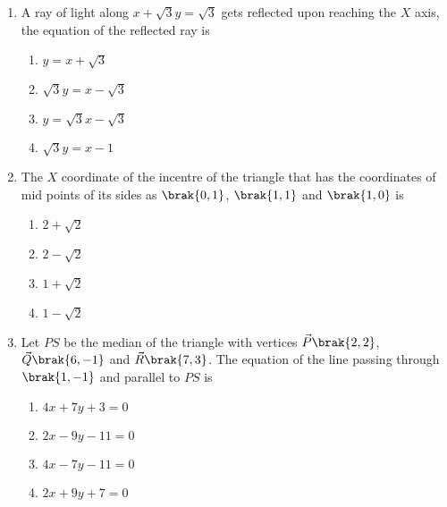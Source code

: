 \begin{enumerate}
\item A ray of light along $x+\sqrt{3}y=\sqrt{3}$ gets reflected upon reaching the $X$ axis, the equation of the reflected ray is \hfill {}
\begin{multicols}{2}
\begin{enumerate}
\item $y=x+\sqrt{3}$
\item $\sqrt{3}y=x-\sqrt{3}$
\item $y=\sqrt{3}x-\sqrt{3}$
\item $\sqrt{3}y=x-1$
\end{enumerate}
\end{multicols}
%
\item The $X$ coordinate of the incentre of the triangle that has the coordinates of mid points of its sides as $\brak{0, 1}$, $\brak{1, 1}$ and $\brak{1, 0}$ is
\hfill {}
\begin{multicols}{4}
\begin{enumerate}
\item $2+\sqrt{2}$
\item $2-\sqrt{2}$
\item $1+\sqrt{2}$
\item $1-\sqrt{2}$
\end{enumerate}
\end{multicols}
%
\item Let $PS$ be the median of the triangle with vertices $\vec{P}\brak{2, 2}$, $\vec{Q}\brak{6, -1}$ and $\vec{R}\brak{7,3}$. The equation of the line passing through $\brak{1, -1}$ and parallel to $PS$ is \hfill {}
\begin{multicols}{2}
\begin{enumerate}
\item $4x+7y+3=0$
\item $2x-9y-11=0$
\item $4x-7y-11=0$
\item $2x+9y+7=0$
\end{enumerate}
\end{multicols}


\end{enumerate}
